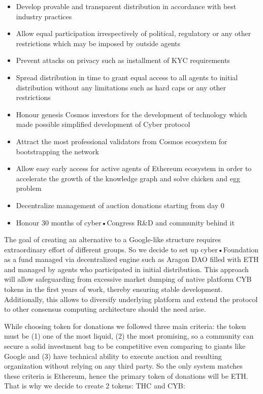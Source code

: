 \documentclass[10pt,oneside]{amsart}
\begin{document}
\begin{itemize}
\item  Develop provable and transparent distribution in accordance with best industry practices
\item  Allow equal participation irrespectively of political, regulatory or any other restrictions which may be imposed by outside agents
\item  Prevent attacks on privacy such as installment of KYC requirements
\item  Spread distribution in time to grant equal access to all agents to initial distribution without any limitations such as hard caps or any other restrictions
\item  Honour genesis Cosmos investors for the development of technology which made possible simplified development of Cyber protocol
\item  Attract the most professional validators from Cosmos ecosystem for bootstrapping the network
\item  Allow easy early access for active agents of Ethereum ecosystem in order to accelerate the growth of the knowledge graph and solve chicken and egg problem
\item  Decentralize management of auction donations starting from day 0
\item  Honour 30 months of cyber•Congress R\&D and community behind it
\end{itemize}

The goal of creating an alternative to a Google-like structure requires extraordinary effort of different groups. So we decide to set up cyber•Foundation as a fund managed via decentralized engine such as Aragon DAO filled with ETH and managed by agents who participated in initial distribution. This approach will allow safeguarding from excessive market dumping of native platform CYB tokens in the first years of work, thereby ensuring stable development. Additionally, this allows to diversify underlying platform and extend the protocol to other consensus computing architecture should the need arise.

While choosing token for donations we followed three main criteria: the token must be (1) one of the most liquid, (2) the most promising, so a community can secure a solid investment bag to be competitive even comparing to giants like Google and (3) have technical ability to execute auction and resulting organization without relying on any third party. So the only system matches these criteria is Ethereum, hence the primary token of donations will be ETH. That is why we decide to create 2 tokens: THC and CYB:
\end{document}

